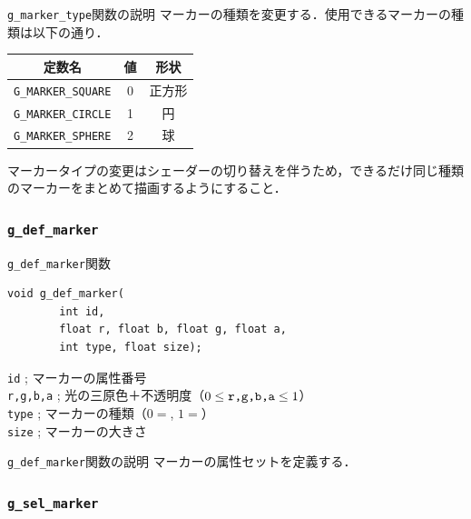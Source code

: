 \documentclass[a4paper,12pt]{jsarticle}%
\begin{document}
\begin{itembox}[l]{\texttt{g\_marker\_type}関数の説明}
マーカーの種類を変更する．使用できるマーカーの種類は以下の通り．
\begin{center}
\begin{tabular}{|c|c|c|}
	\hline 
	定数名 & 値 & 形状 \\ 
	\hline 
	\verb|G_MARKER_SQUARE| & 0 & 正方形 \\ 
	\hline 
	\verb|G_MARKER_CIRCLE| & 1 & 円 \\ 
	\hline 
	\verb|G_MARKER_SPHERE| & 2 & 球 \\ 
	\hline 
\end{tabular}
\end{center}
マーカータイプの変更はシェーダーの切り替えを伴うため，できるだけ同じ種類のマーカーをまとめて描画するようにすること．
\end{itembox}

\clearpage
\subsubsection{\texttt{g\_def\_marker}}

\begin{itembox}[l]{\texttt{g\_def\_marker}関数}
\begin{verbatim}
void g_def_marker(
        int id,
        float r, float b, float g, float a,
        int type, float size);
\end{verbatim}
\verb|id| ; マーカーの属性番号\\
\verb|r,g,b,a| ; 光の三原色＋不透明度（$0\leq \verb|r,g,b,a| \leq 1$）\\
\verb|type| ; マーカーの種類（$0=$, $1=$）\\
\verb|size| ; マーカーの大きさ\\
\end{itembox}

\begin{itembox}[l]{\texttt{g\_def\_marker}関数の説明}
マーカーの属性セットを定義する．
\end{itembox}

\subsubsection{\texttt{g\_sel\_marker}}
\end{document}
